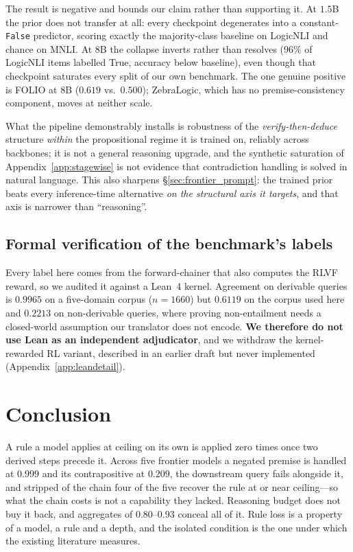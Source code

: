 \documentclass{article}
\begin{document}
The result is negative and bounds our claim rather than supporting it. At $1.5$B the prior does not transfer at all: every checkpoint degenerates into a constant-\texttt{False} predictor, scoring exactly the majority-class baseline on LogicNLI and chance on MNLI. At $8$B the collapse inverts rather than resolves ($96\%$ of LogicNLI items labelled True, accuracy below baseline), even though that checkpoint saturates every split of our own benchmark. The one genuine positive is FOLIO at $8$B ($0.619$ vs.\ $0.500$); ZebraLogic, which has no premise-consistency component, moves at neither scale.

What the pipeline demonstrably installs is robustness of the \emph{verify-then-deduce} structure \emph{within} the propositional regime it is trained on, reliably across backbones; it is not a general reasoning upgrade, and the synthetic saturation of Appendix~\ref{app:stagewise} is not evidence that contradiction handling is solved in natural language. This also sharpens \S\ref{sec:frontier_prompt}: the trained prior beats every inference-time alternative \emph{on the structural axis it targets}, and that axis is narrower than ``reasoning''.

\subsection{Formal verification of the benchmark's labels}
\label{sec:phase2}
Every label here comes from the forward-chainer that also computes the RLVF
reward, so we audited it against a Lean~4 kernel. Agreement on derivable
queries is $0.9965$ on a five-domain corpus ($n{=}1660$) but $0.6119$ on the
corpus used here and $0.2213$ on non-derivable queries, where proving
non-entailment needs a closed-world assumption our translator does not encode.
\textbf{We therefore do not use Lean as an independent adjudicator}, and we
withdraw the kernel-rewarded RL variant, described in an earlier draft but
never implemented (Appendix~\ref{app:leandetail}).

\section{Conclusion}
A rule a model applies at ceiling on its own is applied zero times once two
derived steps precede it. Across five frontier models a negated premise is
handled at $0.999$ and its contrapositive at $0.209$, the downstream query
fails alongside it, and stripped of the chain four of the five recover the rule
at or near ceiling---so what the chain costs is not a capability they lacked.
Reasoning budget does not buy it back, and aggregates of $0.80$--$0.93$ conceal
all of it. Rule loss is a property of a model, a rule and a depth, and the
isolated condition is the one under which the existing literature measures.
\end{document}
